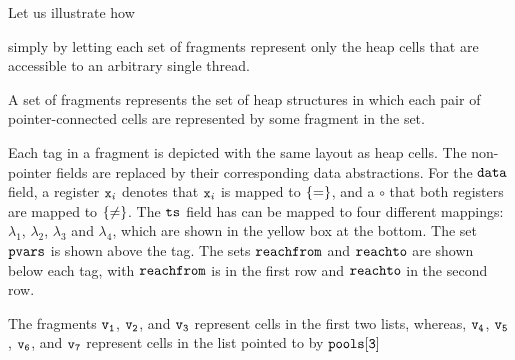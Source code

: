 Let us illustrate how


simply by letting each set of fragments represent only the heap cells that
are accessible to an arbitrary single thread.

A set of fragments represents the set of heap structures in which each
pair of pointer-connected cells are represented by some fragment in the set.


Each tag in a fragment is depicted with the same layout as heap cells.
The non-pointer fields are replaced by their corresponding data abstractions. 
For the $\tt data$ field, a register $\mathtt{x}_i$ denotes that $\mathtt{x}_i$ is mapped to
$\left\{=\right\}$, and a $\circ$ that both registers are mapped to $\left\{\neq\right\}$.
The ${\tt ts}$ field has can be mapped to four different mappings: $\lambda_1$, $\lambda_2$, $\lambda_3$ and $\lambda_4$, which are shown in the
yellow box at the bottom.
The set $\mathtt{pvars}$ is shown above the tag.
The sets $\mathtt{reachfrom}$ and $\mathtt{reachto}$ are shown below each tag, with
$\mathtt{reachfrom}$ is in the first row and $\mathtt{reachto}$ in the second row.

The fragments $\tt v_1$, $\tt v_2$, and $\tt v_3$ represent cells
in the first two lists, whereas, $\tt v_4$, $\tt v_5$, $\tt v_6$, and $\tt v_7$
represent cells in the list pointed to by $\tt pools[3]$




